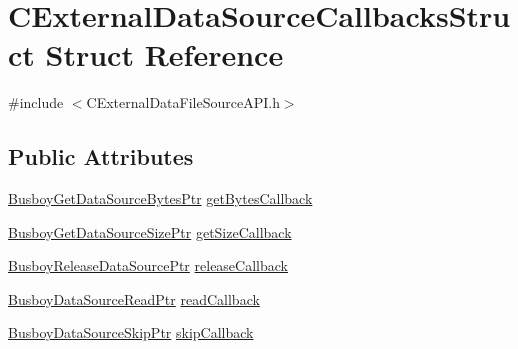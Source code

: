\hypertarget{structCExternalDataSourceCallbacksStruct}{
\section{CExternalDataSourceCallbacksStruct Struct Reference}
\label{structCExternalDataSourceCallbacksStruct}
}


{\ttfamily \#include $<$CExternalDataFileSourceAPI.h$>$}\subsection*{Public Attributes}
\begin{DoxyCompactItemize}
\item 
\hyperlink{CExternalDataFileSourceAPI_8h_afdaae5893383621de296870d8ca07a83}{BusboyGetDataSourceBytesPtr} \hyperlink{structCExternalDataSourceCallbacksStruct_a3faec864ea05d5874d0f2a2dee43093e}{getBytesCallback}
\item 
\hyperlink{CExternalDataFileSourceAPI_8h_a6b73742936a0c3ea97bd63430c897dd3}{BusboyGetDataSourceSizePtr} \hyperlink{structCExternalDataSourceCallbacksStruct_a50191797a730477eefd9022822e5f8a8}{getSizeCallback}
\item 
\hyperlink{CExternalDataFileSourceAPI_8h_a3b729bccb12e371b213287959951ba1d}{BusboyReleaseDataSourcePtr} \hyperlink{structCExternalDataSourceCallbacksStruct_a40743855c62d5e2b5a6f133bdd1f40c5}{releaseCallback}
\item 
\hyperlink{CExternalDataFileSourceAPI_8h_ab7f00094039312b13d2d3d283c93cb99}{BusboyDataSourceReadPtr} \hyperlink{structCExternalDataSourceCallbacksStruct_ae918ed64bf0af253b0cf0af333ad7a14}{readCallback}
\item 
\hyperlink{CExternalDataFileSourceAPI_8h_ad976255a08b4b5ce77c82c09813ddb62}{BusboyDataSourceSkipPtr} \hyperlink{structCExternalDataSourceCallbacksStruct_ad817f240f5cf0fca101b8f093ed16771}{skipCallback}
\end{DoxyCompactItemize}


